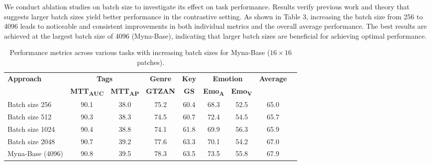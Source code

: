 We conduct ablation studies on batch size to investigate its effect on task performance. Results verify previous work \cite{SimCLR} and theory \cite{SogCLR} that suggests larger batch sizes yield better performance in the contrastive setting. As shown in Table 3, increasing the batch size from 256 to 4096 leads to noticeable and consistent improvements in both individual metrics and the overall average performance. The best results are achieved at the largest batch size of 4096 (Myna-Base), indicating that larger batch sizes are beneficial for achieving optimal performance.

\begin{table*}[h]
\centering
\begin{tabular}{lcccccccc}
\toprule
\textbf{Approach} & \multicolumn{2}{c}{\textbf{Tags}} & \textbf{Genre} & \textbf{Key} & \multicolumn{2}{c}{\textbf{Emotion}} & \textbf{Average} \\
                  & \textbf{MTT\textsubscript{AUC}} & \textbf{MTT\textsubscript{AP}} & \textbf{GTZAN} & \textbf{GS} & \textbf{Emo\textsubscript{A}} & \textbf{Emo\textsubscript{V}} &  \\
\midrule
\midrule
Batch size 256 & 90.1 & 38.0 & 75.2 & 60.4 & 68.3 & 52.5 & 65.0 \\
Batch size 512 & 90.3 & 38.3 & 74.5 & 60.7 & 72.4 & 54.5 & 65.7 \\
Batch size 1024 & 90.4 & 38.8 & 74.1 & 61.8 & 69.9 & 56.3 & 65.9 \\
Batch size 2048 & 90.7 & 39.2 & 77.6 & 63.3 & 70.1 & 54.2 & 67.0 \\
Myna-Base (4096) & 90.8 & 39.5 & 78.3 & 63.5 & 73.5 & 55.8 & 67.9 \\

\bottomrule
\end{tabular}
\caption{Performance metrics across various tasks with increasing batch sizes for Myna-Base ($16 \times 16$ patches).}
\end{table*}